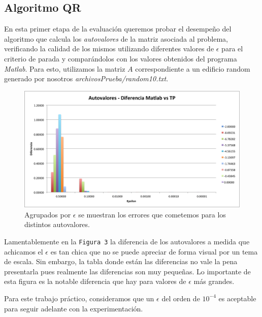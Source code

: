 \documentclass[a4paper]{article}
\begin{document}
\subsection{Algoritmo QR}


En esta primer etapa de la evaluación queremos probar el desempeño del algoritmo que calcula los \textit{autovalores} de la matriz asociada al problema, verificando la calidad de los mismos utilizando diferentes valores de $\epsilon$ para el criterio de parada y comparándolos con los valores obtenidos del programa \textit{Matlab}. Para esto, utilizamos la matriz $A$ correspondiente a un edificio random generado por nosotros \textit{archivosPrueba/random10.txt}. 



\begin{figure}[H]
  \centering
  \includegraphics[scale=0.75]{graficos/3-Autovalores.png}
  \caption{Agrupados por $\epsilon$ se muestran los errores que cometemos para los distintos autovalores.}
\end{figure}

Lamentablemente en la \texttt{Figura 3} la diferencia de los autovalores a medida que achicamos el $\epsilon$ es tan chica que no se puede apreciar de forma visual por un tema de escala. Sin embargo, la tabla donde están las diferencias no vale la pena presentarla pues realmente las diferencias son muy pequeñas. Lo importante de esta figura es la notable diferencia que hay para valores de $\epsilon$ más grandes.

Para este trabajo práctico, consideramos que un $\epsilon$ del orden de $10^{-4}$ es aceptable para seguir adelante con la experimentación.
\end{document}
